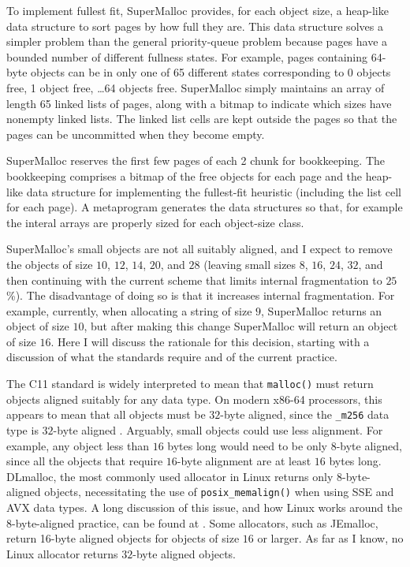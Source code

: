 \documentclass[natbib,sort&compress]{sigplanconf}
\newcommand{\code}[1]{\texttt{#1}}
\begin{document}
To implement fullest fit, SuperMalloc provides, for each object size,
a heap-like data structure to sort pages by how full they are.  This
data structure solves a simpler problem than the general
priority-queue problem because pages have a bounded number of
different fullness states.  For example, pages containing 64-byte
objects can be in only one of 65 different states corresponding to 0
objects free, 1 object free, \ldots 64 objects free.  SuperMalloc
simply maintains an array of length 65 linked lists of pages, along
with a bitmap to indicate which sizes have nonempty linked lists.  The
linked list cells are kept outside the pages so that the pages can be
uncommitted when they become empty.

SuperMalloc reserves the first few pages of each \unit{2}\mebi\byte{}
chunk for bookkeeping.  The bookkeeping comprises a bitmap of the free
objects for each page and the heap-like data structure for
implementing the fullest-fit heuristic (including the list cell for
each page).  A metaprogram generates the data structures so that, for
example the interal arrays are properly sized for each object-size
class.

SuperMalloc's small objects are not all suitably aligned, and I expect
to remove the objects of size $10$, $12$, $14$, $20$, and $28$
(leaving small sizes $8$, $16$, $24$, $32$, and then continuing with
the current scheme that limits internal fragmentation to $25$\%).  The
disadvantage of doing so is that it increases internal fragmentation.
For example, currently, when allocating a string of size $9$,
SuperMalloc returns an object of size $10$, but after making this
change SuperMalloc will return an object of size $16$.  Here I will
discuss the rationale for this decision, starting with a discussion of
what the standards require and of the current practice.

The C11 standard \cite{ISOIEC11} is widely interpreted to mean that
\code{malloc()} must return objects aligned suitably for any data
type. On modern x86-64 processors, this appears to mean that all
objects must be $32$-byte aligned, since the \code{_m256} data type is
$32$-byte aligned \cite{MatzHuJa07}.  Arguably, small objects could
use less alignment.  For example, any object less than $16$ bytes long
would need to be only 8-byte aligned, since all the objects that
require $16$-byte alignment are at least $16$ bytes long.  DLmalloc,
the most commonly used allocator in Linux returns only 8-byte-aligned
objects, necessitating the use of \code{posix_memalign()} when using
SSE and AVX data types.  A long discussion of this issue, and how
Linux works around the 8-byte-aligned practice, can be found at
\cite{Schanda04}.  Some allocators, such as JEmalloc,
return 16-byte aligned objects for objects of size $16$ or larger.  As
far as I know, no Linux allocator returns $32$-byte aligned objects.
\end{document}
